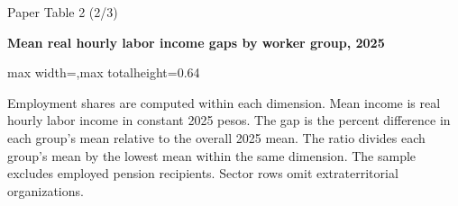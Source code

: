 \begin{frame}{Paper Table 2 (2/3)}
\begin{minipage}{\textwidth}\small\textbf{Mean real hourly labor income gaps by worker group, 2025}\end{minipage}\par\vspace{0.15cm}
\centering\begingroup\fontsize{8.5}{10}\selectfont
\setlength{\tabcolsep}{4pt}\renewcommand{\arraystretch}{1.06}
\begin{adjustbox}{max width=\textwidth,max totalheight=0.64\textheight}

\end{adjustbox}\endgroup\par\vspace{0.10cm}
{\fontsize{6.5}{7.5}\selectfont\raggedright Employment shares are computed within each dimension. Mean income is real hourly labor income in constant 2025 pesos. The gap is the percent difference in each group's mean relative to the overall 2025 mean. The ratio divides each group's mean by the lowest mean within the same dimension. The sample excludes employed pension recipients. Sector rows omit extraterritorial organizations.\par}
\end{frame}

